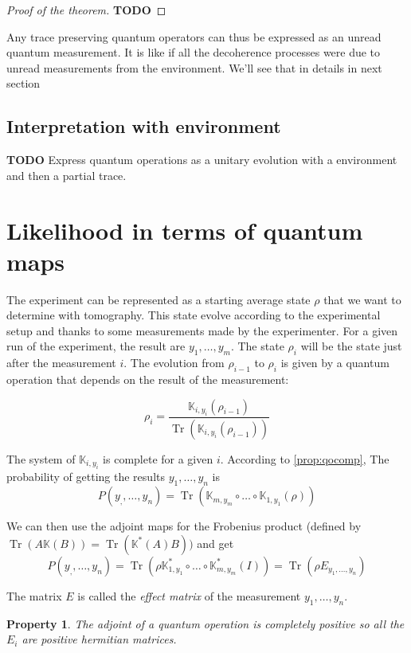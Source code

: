 \documentclass[10pt]{report}
\theoremstyle{plain}
\newtheorem{prop}[thm]{Property}
\theoremstyle{definition}
\theoremstyle{remark}
\newcommand{\TODO}{\textbf{TODO}}
\DeclareMathOperator{\Tr}{Tr}
\newcommand{\trnorm}[1]{\frac{#1}{\Tr\left({#1}\right)}}
\begin{document}
\begin{proof}[Proof of the theorem]
  \TODO{}
\end{proof}

Any trace preserving quantum operators can thus be expressed as an unread
quantum measurement. It is like if all the decoherence processes were due to unread
measurements from the environment. We'll see that in details in next section

\subsection{Interpretation with environment}\label{ssec:interp}

\TODO{} Express quantum operations as a unitary evolution with a environment and then a
partial trace.

\section{Likelihood in terms of quantum maps}

The experiment can be represented as a starting average state $\rho$ that we
want to determine with tomography. This state evolve according to the
experimental setup and thanks to some measurements made by the experimenter. For
a given run of the experiment, the result are $y_1,\ldots,y_m$.
The state $\rho_i$ will be the state just after the measurement $i$. The
evolution from $\rho_{i-1}$ to $\rho_i$ is given by a quantum operation that
depends on the result of the measurement:

\[\rho_i = \trnorm{\mathbb K_{i,y_i}(\rho_{i-1})}\]

The system of $\mathbb K_{i,y_i}$ is complete for a given $i$. According to
\cref{prop:qocomp}, The probability of getting the results $y_1, \ldots, y_n$ is
\[P(y_,,\ldots, y_n) = \Tr(\mathbb K_{m,y_m} \circ \ldots \circ \mathbb K_{1,y_1}(\rho))\]

We can then use the adjoint maps for the Frobenius product (defined by $\Tr(A\mathbb K(B)) = \Tr(\mathbb
K^*(A)B))$ and get
\[P(y_,,\ldots, y_n) = \Tr(\rho \mathbb K_{1,y_1}^* \circ \ldots \circ \mathbb
  K_{m,y_m}^*(I)) = \Tr(\rho E_{y_1,\ldots, y_n})\]

The matrix $E$ is called the \emph{effect matrix} of the measurement
$y_1,\ldots,y_n$.

\begin{prop}
  The adjoint of a quantum operation is completely positive so all the $E_i$ are
  positive hermitian matrices.
\end{prop}
\end{document}
